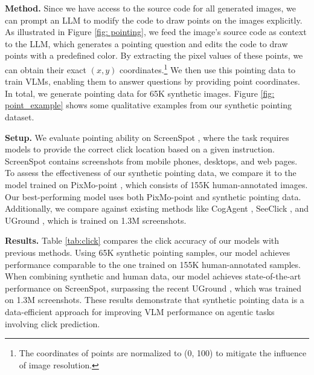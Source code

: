 \smallbreak
\noindent \textbf{Method.}
Since we have access to the source code for all generated images, we can prompt an LLM to modify the code to draw points on the images explicitly. 
As illustrated in Figure \ref{fig: pointing}, we feed the image’s source code as context to the LLM, which generates a pointing question and edits the code to draw points with a predefined color. 
By extracting the pixel values of these points, we can obtain their exact $(x, y)$ coordinates.\footnote{The coordinates of points are normalized to (0, 100) to mitigate the influence of image resolution.} 
We then use this pointing data to train VLMs, enabling them to answer questions by providing point coordinates. 
In total, we generate pointing data for 65K synthetic images. 
Figure \ref{fig: point_example} shows some qualitative examples from our synthetic pointing dataset.

\smallbreak
\noindent \textbf{Setup.}
We evaluate pointing ability on ScreenSpot \cite{cheng2024seeclick}, where the task requires models to provide the correct click location based on a given instruction. ScreenSpot contains screenshots from mobile phones, desktops, and web pages. 
To assess the effectiveness of our synthetic pointing data, we compare it to the model trained on PixMo-point \cite{deitke2024molmo}, which consists of 155K human-annotated images. 
Our best-performing model uses both PixMo-point and synthetic pointing data.
Additionally, we compare against existing methods like CogAgent \cite{hong2024cogagent}, SeeClick \cite{cheng2024seeclick}, and UGround \cite{gou2024navigating}, which is trained on 1.3M screenshots.

\smallbreak
\noindent \textbf{Results.}
Table \ref{tab:click} compares the click accuracy of our models with previous methods.
Using 65K synthetic pointing samples, our model achieves performance comparable to the one trained on 155K human-annotated samples.
When combining synthetic and human data, our model achieves state-of-the-art performance on ScreenSpot, surpassing the recent UGround \cite{gou2024navigating}, which was trained on 1.3M screenshots. These results demonstrate that synthetic pointing data is a data-efficient approach for improving VLM performance on agentic tasks involving click prediction.


